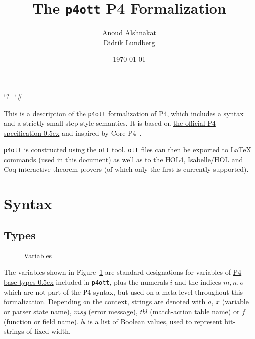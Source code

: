 \documentclass[UTF8]{article}
\title{%
The \texttt{p4ott} P4 Formalization}
\author{Anoud Alshnakat\\
Didrik Lundberg
}
\date{\today}
\begin{document}
\maketitle

\newcommand{\pfott}{\texttt{p4ott}}

\begingroup\lccode`?=`# \lowercase{\endgroup
\newcommand{\specsec}[1]{%
    ?#1%
}
}
\newcommand{\pfourspec}[2]{%
\href{https://p4lang.github.io/p4-spec/docs/P4-16-v1.2.2.html\specsec{#1}}{#2\kern-0.5ex} %
}

\noindent
This is a description of the \pfott{} formalization of P4, which includes a syntax and a strictly small-step style semantics. It is based on \pfourspec{}{the official P4 specification} and inspired by Core P4~\cite{doenges2021petr4}.

\pfott{} is constructed using the \texttt{ott} tool. \texttt{ott} files can then be exported to \LaTeX{} commands (used in this document) as well as to the HOL4, Isabelle/HOL and Coq interactive theorem provers (of which only the first is currently supported).

\section{Syntax}
\subsection{Types}
\newcommand{\num}{\ensuremath{i}}
\newcommand{\vn}{\ensuremath{x}}
\newcommand{\vna}{\ensuremath{a}}
\newcommand{\msg}{\ensuremath{\mathit{msg}}}
\newcommand{\tn}{\ensuremath{\mathit{tbl}}}
\newcommand{\fn}{\ensuremath{f}}
\newcommand{\inte}{\ensuremath{bl}}
%
%
\begin{figure}[h!]
\centering
\ottmetavars
\caption{Variables}
\label{fig:vars}
\end{figure}

The variables shown in Figure~\ref{fig:vars} are standard designations for variables of \pfourspec{sec-base-types}{P4 base types} included in \pfott{}, plus the numerals \num{} and the indices $m, n, o$ which are not part of the P4 syntax, but used on a meta-level throughout this formalization. Depending on the context, strings are denoted with \vna{}, \vn{} (variable or parser state name), \msg{} (error message), \tn{} (match-action table name) or \fn{} (function or field name). \inte{} is a list of Boolean values, used to represent bit-strings of fixed width.
\end{document}

